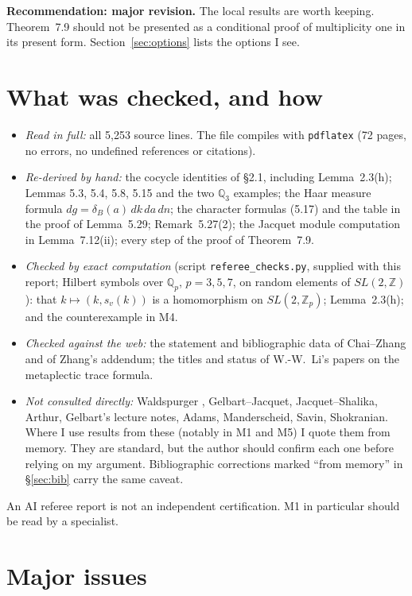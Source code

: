 \documentclass[12pt,letterpaper]{article}
\newcommand{\Q}{\mathbb{Q}}
\newcommand{\Z}{\mathbb{Z}}
\theoremstyle{plain}
\begin{document}
\textbf{Recommendation: major revision.} The local results are worth
keeping. Theorem~7.9 should not be presented as a conditional proof of
multiplicity one in its present form. Section~\ref{sec:options} lists the
options I see.

\section{What was checked, and how}

\begin{itemize}
\item \emph{Read in full:} all 5{,}253 source lines. The file compiles
with \texttt{pdflatex} (72 pages, no errors, no undefined references or
citations).
\item \emph{Re-derived by hand:} the cocycle identities of \S2.1,
including Lemma~2.3(h); Lemmas 5.3, 5.4, 5.8, 5.15 and the two
$\Q_3$ examples; the Haar measure formula $dg=\delta_B(a)\,dk\,da\,dn$; the
character formulas (5.17) and the table in the proof of
Lemma~5.29; Remark~5.27(2); the Jacquet module computation in
Lemma~7.12(ii); every step of the proof of Theorem~7.9.
\item \emph{Checked by exact computation} (script
\texttt{referee\_checks.py}, supplied with this report; Hilbert symbols over
$\Q_p$, $p=3,5,7$, on random elements of $SL(2,\Z)$): that
$k\mapsto(k,s_v(k))$ is a homomorphism on $SL(2,\Z_p)$; Lemma~2.3(h); and
the counterexample in M4.
\item \emph{Checked against the web:} the statement and bibliographic data
of Chai--Zhang and of Zhang's addendum; the titles and status of W.-W.~Li's
papers on the metaplectic trace formula.
\item \emph{Not consulted directly:} Waldspurger \cite{Wa1,Wa2},
Gelbart--Jacquet, Jacquet--Shalika, Arthur, Gelbart's lecture notes, Adams,
Manderscheid, Savin, Shokranian. Where I use results from these (notably in
M1 and M5) I quote them from memory. They are standard, but the author
should confirm each one before relying on my argument. Bibliographic
corrections marked ``from memory'' in \S\ref{sec:bib} carry the same
caveat.
\end{itemize}

An AI referee report is not an independent certification. M1 in particular
should be read by a specialist.

\section{Major issues}
\end{document}
